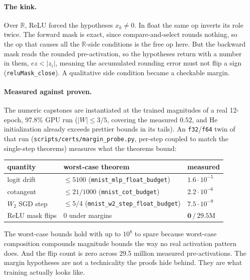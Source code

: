 \paragraph{The kink.}
Over \(\mathbb{R}\), ReLU forced the hypotheses \(x_k \ne 0\). In
float the same op inverts its role twice. The forward mask is
exact, since compare-and-select rounds nothing, so the op that
causes all the \(\mathbb{R}\)-side conditions is the free op here.
But the backward mask reads the rounded pre-activation, so the
hypotheses return with a number in them, \(\mathit{ez} < |z_i|\), meaning
the accumulated rounding error must not flip a sign
(\texttt{reluMask\_close}). A qualitative side condition became a
checkable margin.

\paragraph{Measured against proven.}
The numeric capstones are instantiated at the trained magnitudes
of a real 12-epoch, 97.8\% GPU run (\(|W| \le 3/5\), covering the
measured \(0.52\), and He initialization already exceeds prettier bounds
in its tails). An \texttt{f32}/\texttt{f64} twin of that run
(\texttt{scripts/certs/\allowbreak margin\_probe.py}, per-step coupled to match the
single-step theorems) measures what the theorems bound:

\begin{center}
\begin{tabular}{lll}
quantity & worst-case theorem & measured \\
\hline
logit drift & \(\le 5100\) \;(\texttt{mnist\_mlp\_float\_budget}) & \(1.6\cdot 10^{-5}\) \\
cotangent & \(\le 21/1000\) \;(\texttt{mnist\_cot\_budget}) & \(2.2\cdot 10^{-6}\) \\
\(W_2\) SGD step & \(\le 5/4\) \;(\texttt{mnist\_w2\_step\_float\_budget}) & \(7.5\cdot 10^{-9}\) \\
ReLU mask flips & \(0\) under margins & \(\mathbf{0}\,/\,29.5\mathrm{M}\) \\
\end{tabular}
\end{center}

The worst-case bounds hold
with up to \(10^{8}\) to spare because worst-case composition
compounds magnitude bounds the way no real activation pattern does. And the
flip count is zero across 29.5 million measured pre-activations. The
margin hypotheses are not a technicality the proofs hide behind. They
are what training actually looks like.

